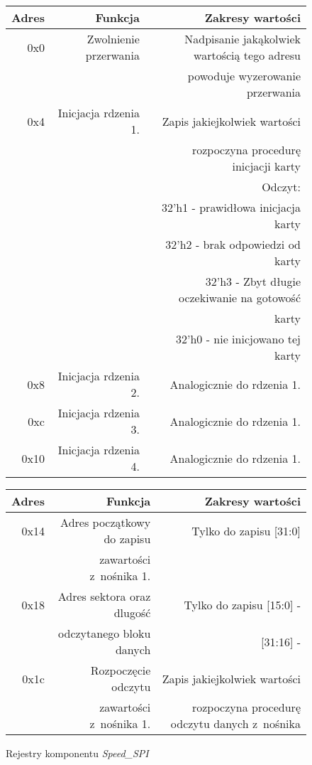 \begin{figure}[h]
	\centering
	\begin{tabular}{|r|r|r|}
		\hline
		Adres & Funkcja & Zakresy wartości\\
		\hline
		0x0 & Zwolnienie przerwania & Nadpisanie jakąkolwiek wartością tego adresu\\
		&& powoduje wyzerowanie przerwania \\
	
		\hline 
		0x4 & Inicjacja rdzenia 1.  & Zapis jakiejkolwiek wartości \\
			&						& rozpoczyna procedurę inicjacji karty \\
			&						& Odczyt: \\
			&						& 32'h1 - prawidłowa inicjacja karty 	   \\
			&						& 32'h2 - brak odpowiedzi od karty		   		   \\
			&						& 32'h3 - Zbyt długie oczekiwanie na gotowość	   \\
			&						& karty										 	   \\
			&						& 32'h0 - nie inicjowano tej karty 	   			   \\
		\hline 
		0x8 & Inicjacja rdzenia 2.  & Analogicznie do rdzenia 1.\\
		\hline 		
		0xc & Inicjacja rdzenia 3.  & Analogicznie do rdzenia 1.\\
		\hline 						
		0x10 & Inicjacja rdzenia 4.  & Analogicznie do rdzenia 1.\\
		\hline 	
		
	\end{tabular}
\end{figure}
\begin{figure}[h]
	\begin{tabular}{|r|r|r|}
		\hline
		Adres & Funkcja & Zakresy wartości\\
		\hline
		0x14 & Adres początkowy do zapisu  & Tylko do zapisu [31:0] \\
			 & zawartości z~nośnika 1.	   &						\\
		\hline 	
		0x18 & Adres sektora oraz dlugość  & Tylko do zapisu [15:0] - \\
			 & odczytanego bloku danych	   & [31:16] - 				\\
		\hline
		0x1c & Rozpoczęcie odczytu		   & Zapis jakiejkolwiek wartości  \\
			 & zawartości z~nośnika 1.	   & rozpoczyna procedurę odczytu danych z~nośnika				\\
		\hline  				
	\end{tabular}
	
	\caption{Rejestry komponentu \textit{Speed\_SPI}}
\end{figure}
\FloatBarrier %

